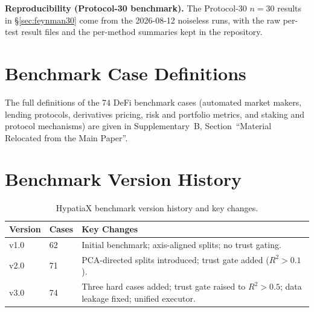 \documentclass[twoside,11pt]{article}
\newcommand{\Rsq}{R^{2}}
\begin{document}
\textbf{Reproducibility (Protocol-30 benchmark).} The Protocol-30 $n=30$ results in
\S\ref{sec:feynman30} come from the 2026-08-12 noiseless runs, with the raw
per-test result files and the per-method summaries kept in the repository.




\appendix

\section{Benchmark Case Definitions}\label{sec:benchmark_cases}
\label{app:cases}

The full definitions of the 74 DeFi benchmark cases (automated market makers, lending protocols, derivatives pricing, risk and portfolio metrics, and staking and protocol mechanisms) are given in Supplementary~B, Section~``Material Relocated from the Main Paper''.

\section{Benchmark Version History}\label{sec:version_history}
\label{app:versions}

\begin{table}[h]
\centering
\caption{HypatiaX benchmark version history and key changes.}
\begin{tabular}{llp{8cm}}
\toprule
Version & Cases & Key Changes \\
\midrule
v1.0 & 62 & Initial benchmark; axis-aligned splits; no trust gating. \\
v2.0 & 71 & PCA-directed splits introduced; trust gate added ($\Rsq > 0.1$). \\
v3.0 & 74 & Three hard cases added; trust gate raised to $\Rsq > 0.5$; data leakage fixed; unified executor. \\
\bottomrule
\end{tabular}
\end{table}
\end{document}
